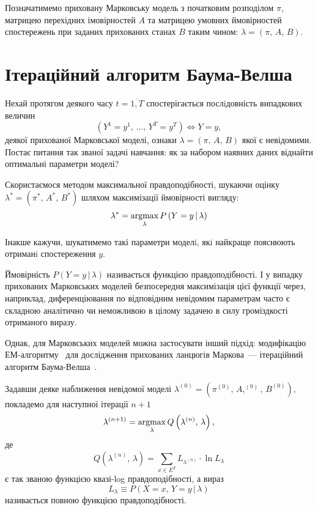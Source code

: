 Позначатимемо приховану Марковську модель з початковим розподілом $\pi$, матрицею перехідних імовірностей $A$ та матрицею умовних ймовірностей спостережень при заданих прихованих станах $B$ таким чином: $\lambda=(\pi,\,A,\,B)$.

\section{Ітераційний алгоритм Баума-Велша}

Нехай протягом деякого часу $t=\overline{1,T}$ спостерігається послiдовність випадкових величин 
\begin{equation*}
    \left( Y^1=y^1,\,\ldots,\,Y^T=y^T \right) \Longleftrightarrow Y=y,
\end{equation*}
деякої прихованої Марковської моделі, ознаки $\lambda=(\pi,\,A,\,B)$ якої є невідомими. Постає питання так званої задачі навчання: як за набором наявних даних віднайти оптимальні параметри моделі?

Скористаємося методом максимальної правдоподібності, шукаючи оцінку $\lambda^*=(\pi^*,\,A^*,\,B^*)$ шляхом максимізації ймовірності вигляду:
\begin{equation}\label{eq: likelihood function}
    \lambda^{*}=\operatorname*{argmax}\limits_{\lambda} P\left( Y=y \,|\, \lambda \right)
\end{equation}

Інакше кажучи, шукатимемо такі параметри моделi, якi найкраще пояснюють отриманi спостереження $y$. 

Ймовірність $P\left( Y=y \,|\, \lambda \right)$ називається функцією правдоподібності. І у випадку прихованих Марковських моделей безпосередня максимізація цієї функції через, наприклад, диференціювання по відповідним невідомим параметрам часто є складною аналітично чи неможливою в цілому задачею в силу громіздкості отриманого виразу.

Однак, для Марковських моделей можна застосувати інший підхід: модифікацію ЕМ-алгоритму~\cite[розділ 4]{Koski2001} для дослідження прихованих ланцюгів Маркова~--- ітераційний алгоритм Баума-Велша~\cite[розділ 15]{Koski2001}. 

Задавши деяке наближення невідомої моделі $\lambda^{(0)}=(\pi^{(0)},\,A,^{(0)},\,B^{(0)})$, покладемо для наступної ітерації $n+1$
\begin{equation*}
    \lambda^{(n+1)} = \operatorname*{argmax}\limits_{\lambda} Q\left( \lambda^{(n)},\,\lambda \right),
\end{equation*}
де
\begin{equation}\label{eq: Q quasi-log likelihood function}
    Q\left( \lambda^{(n)},\,\lambda \right) = \sum\limits_{x \in E^T}L_{\lambda^{(n)}}\cdot\ln L_{\lambda}
\end{equation}
є так званою функцією квазі-log правдоподібності, а вираз
\begin{equation*}
    L_{\lambda} \equiv P\left( X=x,\,Y=y \,|\, \lambda \right)
\end{equation*}
називається повною функцією правдоподібності.

